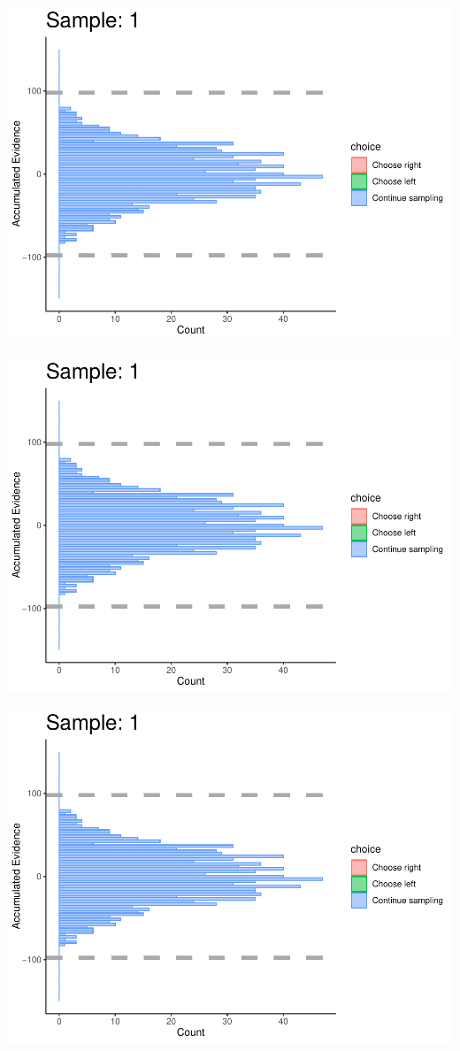\documentclass[
]{book}
\begin{document}
\begin{center}\includegraphics[width=0.8\linewidth]{LateNightBayes_files/figure-latex/collapsing_check-2} \end{center}

\begin{center}\includegraphics[width=0.8\linewidth]{LateNightBayes_files/figure-latex/collapsing_check-3} \end{center}

\begin{center}\includegraphics[width=0.8\linewidth]{LateNightBayes_files/figure-latex/collapsing_check-4} \end{center}
\end{document}
